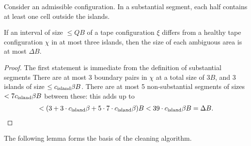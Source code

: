 \documentclass[12pt]{memoir}
\renewcommand{\le}{\leq}
\def\B{B}
\newcommand{\Q}{Q}
\newcommand{\cns}[1]{c_{\textrm{\upshape #1}}}
\begin{document}
\begin{lemma}\label{lem:ambiguous}
Consider an admissible configuration.
In a substantial segment, each half contains at least one cell outside the islands.

If an interval of size \( \le  \Q\B \) of a tape configuration \( \xi \) differs from a  healthy tape 
configuration \( \chi \) in at most three islands, then 
the size of each ambiguous area is at most \( \Delta\B \).
\end{lemma}
\begin{proof}
The first statement is immediate from the definition of substantial segments 
There are at most 3 boundary pairs in \( \chi \) at a total size of \( 3\B \), and
3 islands of size \( \le\cns{island}\beta\B \).
There are at most 5 non-substantial segments of sizes \( < 7\cns{island}\beta\B \)
between these: this adds up to
\begin{align*}
 < (3+3\cdot\cns{island}\beta+ 5\cdot 7\cdot\cns{island}\beta)\B<39\cdot\cns{island}\beta\B=\Delta\B.
 \end{align*}
\end{proof}

The following lemma forms the basis of the cleaning algorithm.
\end{document}
